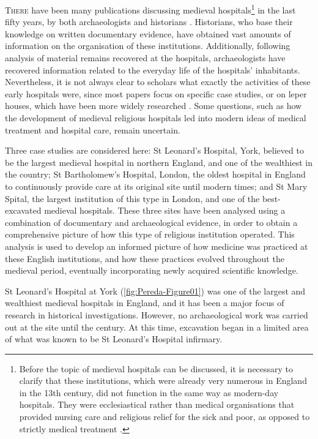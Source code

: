 \renewcommand\AD{\xspace}
%
\IJSRAopening%
\lettrine{T}{here} have been many publications discussing medieval hospitals\footnote{Before the topic of medieval hospitals can be discussed, it is necessary to clarify that these institutions, which were already very numerous in England in the 13th century, did not function in the same way as modern-day hospitals. They were ecclesiastical rather than medical organisations that provided nursing care and religious relief for the sick and poor, as opposed to strictly medical treatment \parencite{Clay_1966}.} 
in the last fifty years, by both archaeologists and historians \parencites{Cullum_1991}{Phillpotts_1997}{Rawcliffe_1999}{White_2007}. 
Historians, who base their knowledge on written documentary evidence, have obtained vast amounts of information on the organisation of these institutions. Additionally, following analysis of material remains recovered at the hospitals, archaeologists have recovered information related to the everyday life of the hospitals’ inhabitants. Nevertheless, it is not always clear to scholars what exactly the activities of these early hospitals were, since most papers focus on specific case studies, or on leper houses, which have been more widely researched \parencite[76-78]{Watson_2006}. 
Some questions, such as how the development of medieval religious hospitals led into modern ideas of medical treatment and hospital care, remain uncertain.

Three case studies are considered here: St Leonard’s Hospital, York, believed to be the largest medieval hospital in northern England, and one of the wealthiest in the country; St Bartholomew’s Hospital, London, the oldest hospital in England to continuously provide care at its original site until modern times; and St Mary Spital, the largest institution of this type in London, and one of the best-excavated medieval hospitals. 
These three sites have been analysed using a combination of documentary and archaeological evidence, in order to obtain a comprehensive picture of how this type of religious institution operated. This analysis is used to develop an informed picture of how medicine was practiced at these English institutions, and how these practices evolved throughout the medieval period, eventually incorporating newly acquired scientific knowledge.


St Leonard’s Hospital at York (\cref{fig:Pereda-Figure01}) %
 was one of the largest and wealthiest medieval hospitals in England, and it has been a major focus of research in historical investigations. However, no archaeological work was carried out at the site until the  century. 
 At this time, excavation began in a limited area of what was known to be St Leonard’s Hospital infirmary.
 
